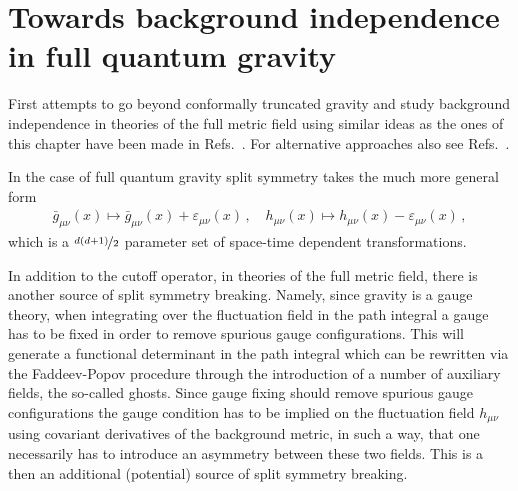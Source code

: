 \documentclass[11pt]{book}
\numberwithin{equation}{chapter}
\begin{document}
\section{Towards background independence in full quantum gravity}

First attempts to go beyond conformally truncated gravity and study background
independence in theories of the full metric field using similar ideas as
the ones of this chapter have been made in
Refs.~\cite{Morris:2016spn, Percacci:2016arh}.
For alternative approaches also see
Refs.~\cite{
  Donkin:2012ud, Manrique:2009uh, Manrique:2010mq, Manrique:2010am,
  Becker:2014qya, Christiansen:2012rx, Christiansen:2014raa
}.

In the case of full quantum gravity split symmetry
takes the much more general form
\begin{align}
  \bar g_{\mu \nu}(x) \mapsto \bar g_{\mu\nu}(x) + \varepsilon_{\mu\nu}(x) \,,
  \quad
  h_{\mu \nu}(x) \mapsto h_{\mu\nu}(x) - \varepsilon_{\mu\nu}(x) \,,
\end{align}
which is a $\nicefrac{d(d+1)}{2}$ parameter set of space-time dependent transformations.

In addition to the cutoff operator, in theories of the full metric field,
there is another source of split symmetry breaking. Namely, since gravity is a
gauge theory, when integrating over the fluctuation field in the path integral
a gauge has to be fixed in order to remove spurious gauge configurations.
This will generate a functional determinant in the path integral which can be rewritten via
the Faddeev-Popov procedure through the introduction of a number of auxiliary fields,
the so-called ghosts. Since gauge fixing should remove spurious gauge configurations
the gauge condition has to be implied on the fluctuation field $h_{\mu\nu}$ using
covariant derivatives of the background metric, in such a way, that one necessarily
has to introduce an asymmetry between these two fields. This is a then an additional
(potential) source of split symmetry breaking.
\end{document}
